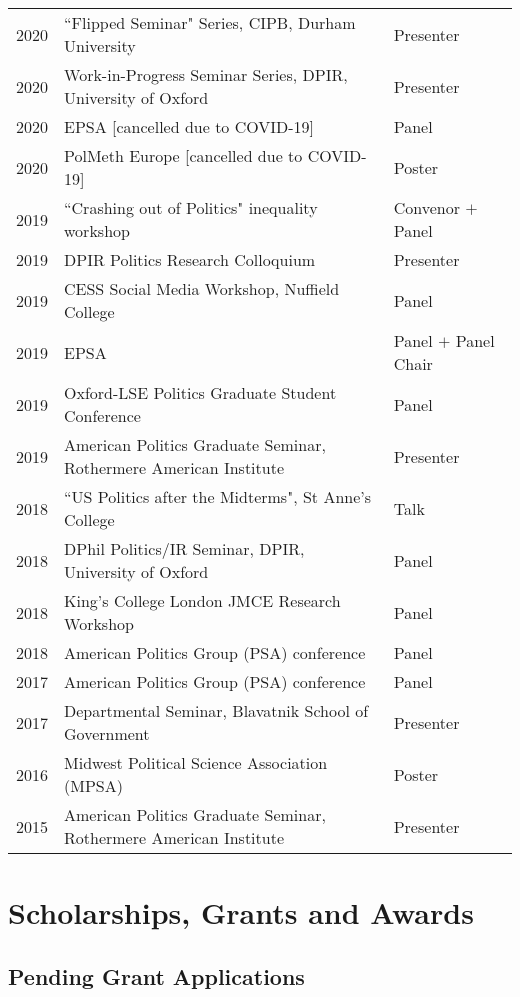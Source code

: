 \documentclass[11pt, a4paper]{article}
\begin{document}
 \begin{tabular}{lll}
 	 2020 & ``Flipped Seminar" Series, CIPB, Durham University & Presenter \\
 	 2020 & Work-in-Progress Seminar Series, DPIR, University of Oxford & Presenter \\
 	 2020 & EPSA [cancelled due to COVID-19] & Panel \\
     2020 & PolMeth Europe [cancelled due to COVID-19] & Poster \\
     2019 & ``Crashing out of Politics" inequality workshop & Convenor $+$ Panel \\
     2019 & DPIR Politics Research Colloquium & Presenter \\
     2019 & CESS Social Media Workshop, Nuffield College & Panel \\
     2019 & EPSA  & Panel $+$ Panel Chair \\
     2019 & Oxford-LSE Politics Graduate Student Conference & Panel \\
     2019 & American Politics Graduate Seminar, Rothermere American Institute & Presenter \\
     2018 & ``US Politics after the Midterms", St Anne's College & Talk \\
     2018 & DPhil Politics/IR Seminar, DPIR, University of Oxford & Panel \\
     2018 & King's College London JMCE Research Workshop & Panel \\
     2018 & American Politics Group (PSA) conference & Panel \\
     2017 & American Politics Group (PSA) conference & Panel \\
     2017 & Departmental Seminar, Blavatnik School of Government & Presenter \\
     2016 & Midwest Political Science Association (MPSA) & Poster \\
     2015 & American Politics Graduate Seminar, Rothermere American Institute & Presenter
 \end{tabular}

 \section*{Scholarships, Grants and Awards}

\subsection*{Pending Grant Applications}
\end{document}
